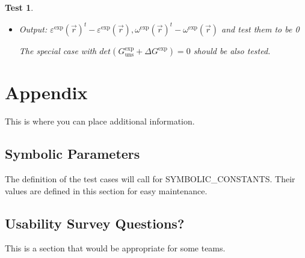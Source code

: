 \documentclass[12pt, titlepage]{article}
\newtheorem{Test}{Test}
\begin{document}
\begin{Test}
\begin{itemize}
\begin{itemize}
	\item Pure rotation,\\
	\newline
	$\begin{cases} 
	\forall \vec{r} \in \mathbb{I}, \ \varepsilon^{\text{exp}}(\vec{r}) = \begin{bmatrix}
	0 & 0 \\
	0 & 0
	\end{bmatrix}  \\
	\forall \vec{r} \in \mathbb{I}, \  \omega^{\text{exp}}(\vec{r}) = \begin{bmatrix}
	0 & \frac{1}{11} \\
	-\frac{1}{11} & 0 
	\end{bmatrix} 
	\end{cases}$
	\end{itemize}

\item Output:  ${\varepsilon^{\text{exp}}(\vec{r})}^{t}-\varepsilon^{\text{exp}}(\vec{r}), {\omega^{\text{exp}}(\vec{r})}^{t}- \omega^{\text{exp}}(\vec{r})$  and test them to be 0

The special case with $det(G_{\text{uns}}^{\text{exp}}+\Delta G^{\text{exp}})=0$ should be also tested.

\end{itemize}
\end{Test}					




\newpage

\section{Appendix}

This is where you can place additional information.

\subsection{Symbolic Parameters}

The definition of the test cases will call for SYMBOLIC\_CONSTANTS.
Their values are defined in this section for easy maintenance.

\subsection{Usability Survey Questions?}

This is a section that would be appropriate for some teams.
\end{document}
